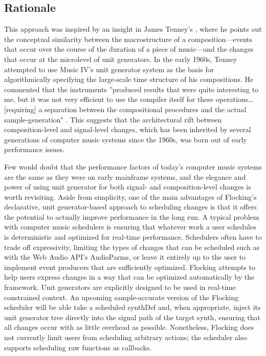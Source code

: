 \documentclass{article}
\begin{document}
\subsection{Rationale}

This approach was inspired by an insight in James Tenney's \cite{tenney1969computer}, where he points out the conceptual similarity between the macrostructure of a composition---events that occur over the course of the duration of a piece of music---and the changes that occur at the microlevel of unit generators. In the early 1960s, Tenney attempted to use Music IV's unit generator system as the basis for algorithmically specifying the large-scale time structure of his compositions. He commented that the instruments ''produced results that were quite interesting to me, but it was not very efficient to use the compiler itself for these operations\ldots [requiring] a separation between the compositional procedures and the actual sample-generation" \cite[p.41--42]{tenney1969computer}. This suggests that the architectural rift between composition-level and signal-level changes, which has been inherited by several generations of computer music systems since the 1960s, was born out of early performance issues.

Few would doubt that the performance factors of today's computer music systems are the same as they were on early mainframe systems, and the elegance and power of using unit generator for both signal- and composition-level changes is worth revisiting. Aside from simplicity, one of the main advantages of Flocking's declarative, unit generator-based approach to scheduling changes is that it offers the potential to actually improve performance in the long run. A typical problem with computer music schedulers is ensuring that whatever work a user schedules is deterministic and optimized for real-time performance. Schedulers often have to trade off expressivity, limiting the types of changes that can be scheduled such as with the Web Audio API's AudioParms, or leave it entirely up to the user to implement event producers that are sufficiently optimized. Flocking attempts to help users express changes in a way that can be optimized automatically by the framework. Unit generators are explicitly designed to be used in real-time constrained context. An upcoming sample-accurate version of the Flocking scheduler will be able take a scheduled synthDef and, when appropriate, inject its unit generator tree directly into the signal path of the target synth, ensuring that all changes occur with as little overhead as possible. Nonetheless, Flocking does not currently limit users from scheduling arbitrary actions; the scheduler also supports scheduling raw functions as callbacks.
\end{document}
